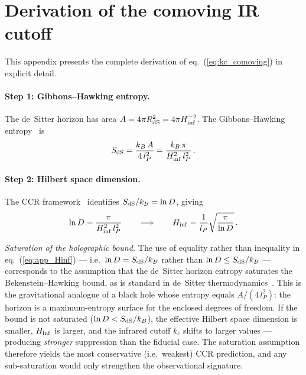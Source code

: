 
\appendix

\section{Derivation of the comoving IR cutoff}
\label{app:derivation}

This appendix presents the complete derivation of eq.~(\ref{eq:kc_comoving})
in explicit detail.

\paragraph{Step 1: Gibbons--Hawking entropy.}
The de~Sitter horizon has area $A = 4\pi R_{\rm dS}^2 = 4\pi H_{\rm inf}^{-2}$.
The Gibbons--Hawking entropy~\cite{Gibbons:1977} is
\begin{equation}
  S_{\rm dS} = \frac{k_B\,A}{4\,l_P^2}
  = \frac{k_B\,\pi}{H_{\rm inf}^2\,l_P^2}\,.
  \label{eq:app_SdS}
\end{equation}

\paragraph{Step 2: Hilbert space dimension.}
The CCR framework~\cite{Chronis:2026} identifies $S_{\rm dS}/k_B = \ln D$,
giving
\begin{equation}
  \ln D = \frac{\pi}{H_{\rm inf}^2\,l_P^2}
  \qquad\Longrightarrow\qquad
  H_{\rm inf} = \frac{1}{l_P}\sqrt{\frac{\pi}{\ln D}}\,.
  \label{eq:app_Hinf}
\end{equation}

\noindent\textit{Saturation of the holographic bound.}
The use of equality rather than inequality in eq.~(\ref{eq:app_Hinf})
--- i.e.\ $\ln D = S_{\rm dS}/k_B$ rather than $\ln D \leq S_{\rm dS}/k_B$
--- corresponds to the assumption that the de~Sitter horizon entropy
saturates the Bekenstein--Hawking bound, as is standard in de~Sitter
thermodynamics~\cite{Gibbons:1977}.  This is the gravitational
analogue of a black hole whose entropy equals $A/(4\,l_P^2)$: the
horizon is a maximum-entropy surface for the enclosed degrees of
freedom.  If the bound is not saturated ($\ln D < S_{\rm dS}/k_B$),
the effective Hilbert space dimension is smaller, $H_{\rm inf}$ is
larger, and the infrared cutoff $k_c$ shifts to larger values ---
producing \emph{stronger} suppression than the fiducial case.  The
saturation assumption therefore yields the most conservative (i.e.\
weakest) CCR prediction, and any sub-saturation would only strengthen
the observational signature.

